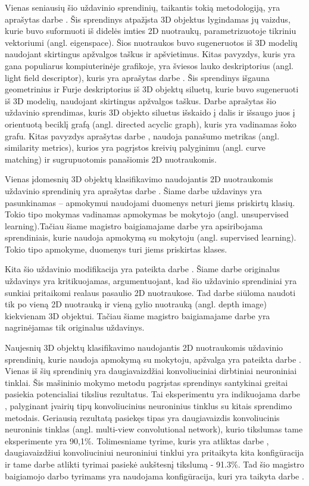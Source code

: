 Vienas seniausių šio uždavinio sprendinių, taikantis tokią metodologiją, yra aprašytas darbe \cite{prevWparEig}. Šis sprendinys atpažįsta 3D objektus lygindamas jų vaizdus, kurie buvo suformuoti iš didelės imties 2D nuotraukų, parametrizuotoje tikriniu vektoriumi (angl. eigenspace). Šios nuotraukos buvo sugeneruotos iš 3D modelių naudojant skirtingus apžvalgos taškus ir apšvietimus. Kitas pavyzdys, kuris yra gana populiarus kompiuterinėje grafikoje, yra šviesos lauko deskriptorius (angl. light field descriptor), kuris yra aprašytas darbe \cite{prevWLightFld}. Šis sprendinys išgauna geometrinius ir Furje deskriptorius iš 3D objektų siluetų, kurie buvo sugeneruoti iš 3D modelių, naudojant skirtingus apžvalgos taškus. Darbe \cite{prevWShockGraph} aprašytas šio uždavinio sprendimas, kuris 3D objekto siluetus išskaido į dalis ir išsaugo juos į orientuotą beciklį grafą (angl. directed acyclic graph), kuris yra vadinamas šoko grafu. Kitas pavyzdys aprašytas darbe \cite{prevWSimMet}, naudoja panašumo metrikas (angl. similarity metrics), kurios yra pagrįstos kreivių palyginimu (angl. curve matching) ir sugrupuotomis panašiomis 2D nuotraukomis.

Vienas įdomesnių 3D objektų klasifikavimo naudojantis 2D nuotraukomis uždavinio sprendinių yra aprašytas darbe \cite{self_supervised}. Šiame darbe uždavinys yra pasunkinamas -- apmokymui naudojami duomenys neturi jiems priskirtų klasių. Tokio tipo mokymas vadinamas apmokymas be mokytojo (angl. unsupervised learning).Tačiau šiame magistro baigiamajame darbe yra apsiribojama sprendiniais, kurie naudoja apmokymą su mokytoju (angl. supervised learning). Tokio tipo apmokyme, duomenys turi jiems priskirtas klases.

Kita šio uždavinio modifikacija yra pateikta darbe \cite{depth_images}. Šiame darbe originalus uždavinys yra kritikuojamas, argumentuojant, kad šio uždavinio sprendiniai yra sunkiai pritaikomi realaus pasaulio 2D nuotraukose. Tad darbe \cite{depth_images} siūloma naudoti tik po vieną 2D nuotrauką ir vieną gylio nuotrauką (angl. depth image) kiekvienam 3D objektui. Tačiau šiame magistro baigiamajame darbe yra nagrinėjamas tik originalus uždavinys.

Naujesnių 3D objektų klasifikavimo naudojantis 2D nuotraukomis uždavinio sprendinių, kurie naudoja apmokymą su mokytoju, apžvalga yra pateikta darbe \cite{survey}. Vienas iš šių sprendinių yra daugiavaizdžiai konvoliuciniai dirbtiniai neuroniniai tinklai. Šis mašininio mokymo metodu pagrįstas sprendinys santykinai greitai pasiekia potencialiai tikslius rezultatus. Tai eksperimentu yra indikuojama darbe \cite{cnnExp1}, palyginant įvairių tipų konvoliucinius neuroninius tinklus su kitais sprendimo metodais. Geriausią rezultatą pasiekęs tipas yra daugiavaizdis konvoliucinis neuroninis tinklas (angl. multi-view convolutional network), kurio tikslumas tame eksperimente yra 90,1\%. Tolimesniame tyrime, kuris yra atliktas darbe \cite{cnnExp2}, daugiavaizdžiui konvoliuciniui neuroniniui tinklui yra pritaikyta kita konfigūracija ir tame darbe atlikti tyrimai pasiekė aukštesnį tikslumą - 91.3\%. Tad šio magistro baigiamojo darbo tyrimams yra naudojama konfigūracija, kuri yra taikyta darbe \cite{cnnExp2}.

